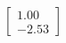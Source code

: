 \documentclass[preview]{standalone}
\begin{document}
\begin{align*}
\begin{bmatrix} 1.00 \\ -2.53 \end{bmatrix}
\end{align*}
\end{document}
